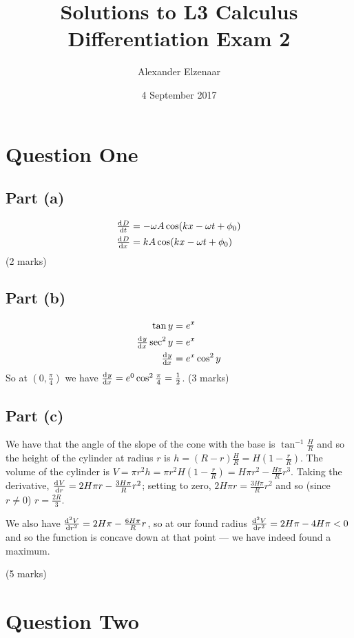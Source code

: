 \documentclass[a4paper]{report}
\title{Solutions to L3 Calculus Differentiation Exam 2}
\author{Alexander Elzenaar}
\date{4 September 2017}
\begin{document}
\maketitle

\section*{Question One}
\subsection*{Part (a)}
\begin{align*}
  \od{D}{t} &= -\omega A \cos(kx  - \omega t + \phi_0)\\
  \od{D}{x} &= kA \cos(kx  - \omega t + \phi_0)
\end{align*}
(2 marks)

\subsection*{Part (b)}
\begin{align*}
  \tan y &= e^x\\
  \od{y}{x} \sec^2 y &= e^x\\
  \od{y}{x} &= e^x \cos^2 y
\end{align*}
So at $ (0, \frac{\pi}{4}) $ we have $ \od{y}{x} = e^0 \cos^2 \frac{\pi}{4} = \frac{1}{2} $.
(3 marks)

\subsection*{Part (c)}
We have that the angle of the slope of the cone with the base is $ \tan^{-1} \frac{H}{R} $ and
so the height of the cylinder at radius $ r $ is $ h = (R - r)\frac{H}{R} = H(1 - \frac{r}{R}) $. The
volume of the cylinder is $ V = \pi r^2 h = \pi r^2 H(1 - \frac{r}{R}) = H\pi r^2 - \frac{H\pi}{R} r^3 $.
Taking the derivative, $ \od{V}{r} = 2H\pi r - \frac{3H\pi}{R} r^2 $; setting to zero, $ 2H\pi r = \frac{3H\pi}{R} r^2 $
and so (since $ r \neq 0 $) $ r = \frac{2R}{3} $.

We also have $ \od[2]{V}{r} = 2H\pi - \frac{6H\pi}{R} r $, so at our found radius $ \od[2]{V}{r} = 2H\pi - 4H\pi < 0 $ and
so the function is concave down at that point --- we have indeed found a maximum.

(5 marks)

\section*{Question Two}
\end{document}
